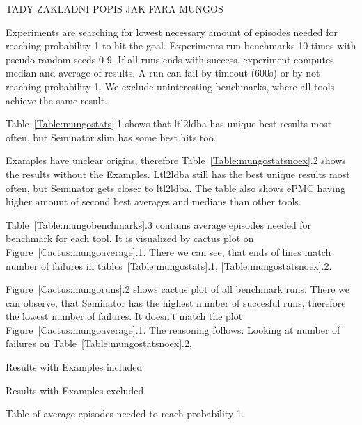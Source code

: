 \documentclass[
	digital,
nolof, nolot
]{fithesis3}
\begin{document}
	TADY ZAKLADNI POPIS JAK FARA MUNGOS
	
	Experiments are searching for lowest necessary amount of episodes needed for reaching probability 1 to hit the goal. Experiments run benchmarks 10 times with pseudo random seeds 0-9. If all runs ends with success, experiment computes median and average of results. A run can fail by timeout (600s) or by not reaching probability 1. We exclude uninteresting benchmarks, where all tools achieve the same result. 
	
	Table~\ref{Table:mungostats}.1 shows that ltl2ldba has unique best results most often, but Seminator slim has some best hits too.
	
	Examples have unclear origins, therefore Table~\ref{Table:mungostatsnoex}.2 shows the results without the Examples. Ltl2ldba still has the best unique results most often, but Seminator gets closer to ltl2ldba. The table also shows ePMC having higher amount of second best averages and medians than other tools. 
	
	Table~\ref{Table:mungobenchmarks}.3 contains average episodes needed for benchmark for each tool. It is visualized by cactus plot on Figure~\ref{Cactus:mungoaverage}.1. There we can see, that ends of lines match number of failures in tables~\ref{Table:mungostats}.1, \ref{Table:mungostatsnoex}.2.
	
	Figure~\ref{Cactus:mungoruns}.2 shows cactus plot of all benchmark runs. There we can observe, that Seminator has the highest number of succesful runs, therefore the lowest number of failures. It doesn't match the plot Figure~\ref{Cactus:mungoaverage}.1. The reasoning follows: Looking at number of failures on Table~\ref{Table:mungostatsnoex}.2, 
	
	
	
	\begin{table}[ht]
		\centering
		\label{Table:mungostats}
		\caption{Results with Examples included}
		
	\end{table}
	
	\begin{table}[ht]
		\centering
		\label{Table:mungostatsnoex}
		\caption{Results with Examples excluded }
		
	\end{table}
	
	\begin{table}[ht]
		\centering
		\label{Table:mungobenchmarks}
		\caption{Table of average episodes needed to reach probability 1.}
		
	\end{table}
	
\end{document}
